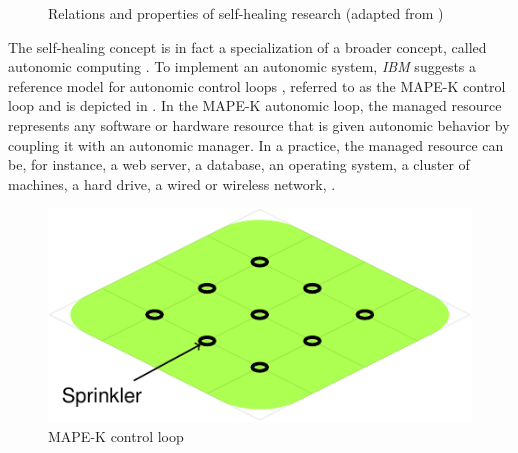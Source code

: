 \begin{figure}[!ht]
{
  }
  \caption{Relations and properties of self-healing research (adapted
    from \cite{Psaier11})}
  \label{fig:introduction:self-healing}
\end{figure}


The self-healing concept is in fact a specialization of a broader
concept, called autonomic computing \cite{Kephart03}.
%
To implement an autonomic system, \emph{IBM} suggests a reference
model for autonomic control loops \cite{IBM06}, referred to as the
\ac{MAPE-K} control loop and is depicted in
.
%
In the \ac{MAPE-K} autonomic loop, the managed resource represents
any software or hardware resource that is given autonomic behavior by
coupling it with an autonomic manager.
%
In a practice, the managed resource can be, for instance, a web
server, a database, an operating system, a cluster of machines, a hard
drive, a wired or wireless network, \etc.

\begin{figure}[!ht]
  \includegraphics[width=0.6\columnwidth,page=13]{figures/introduction/figures/main.pdf}
  \caption{\acs{MAPE-K} control loop\label{fig:intro:MAPE-K-control-loop} }
\end{figure}




